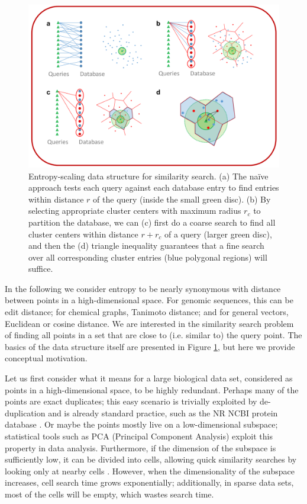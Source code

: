 \documentclass[review,preprint,12pt]{elsarticle}
\renewcommand{\cite}{\citep} %
\theoremstyle{definition}
\theoremstyle{remark}
\numberwithin{equation}{section}
\begin{document}
\begin{figure}[p]
    \centering
    \centerline{\includegraphics[width=8in]{assets/dataStructure.png}}
    \caption{ Entropy-scaling data structure for similarity search. %
            (a) The na\"ive approach tests each query against each database entry to find entries within distance $r$ of the query (inside the small green disc). %
            (b) By selecting appropriate cluster centers with maximum radius $r_c$ to partition the database, we can (c) first do a coarse search to find all cluster centers within distance $r+r_c$ of a query (larger green disc), %
 and then the (d) triangle inequality guarantees that a fine search over all corresponding cluster entries (blue polygonal regions) will suffice.}
    \label{fig:dataStructure}
\end{figure}

In the following we consider entropy to be nearly synonymous with distance between points in a high-dimensional space.
For genomic sequences, this can be edit distance; for chemical graphs, Tanimoto 
distance; and for general vectors, Euclidean or cosine distance.
We are interested in the similarity search problem of
finding all points in a set that are close to (i.e. similar to) the query point.
The basics of the data structure itself are presented in Figure \ref{fig:dataStructure}, but here we provide conceptual motivation.

Let us first consider what it means for a large biological data set, considered as points in a high-dimensional space, to be highly redundant.
Perhaps many of the points are exact duplicates; this easy scenario is trivially exploited by de-duplication and is already standard practice, such as
the NR NCBI protein database \cite{pruitt2005ncbi}.
Or maybe the points mostly live on a low-dimensional subspace; statistical tools such as PCA (Principal Component Analysis) exploit this property in data analysis.
Furthermore, if the dimension of the subspace is sufficiently low,
it can be divided into cells, allowing quick similarity searches by looking only at nearby cells \cite{weber1998quantitative}.
However, when the dimensionality of the subspace increases, cell search time 
grows exponentially; additionally, in sparse data sets, most of the cells will 
be empty, which wastes search time.
\end{document}

